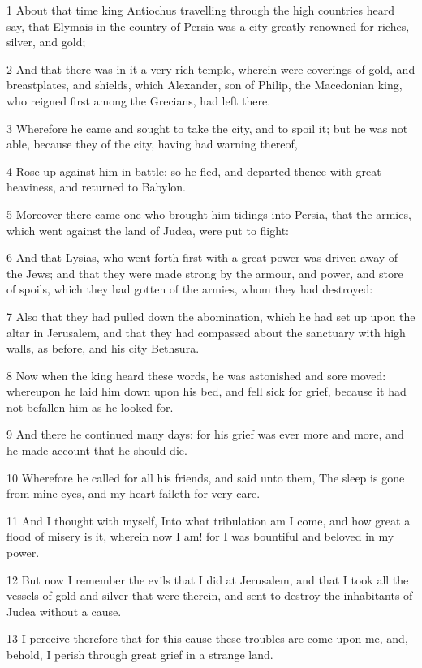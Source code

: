 \par 1 About that time king Antiochus travelling through the high countries heard say, that Elymais in the country of Persia was a city greatly renowned for riches, silver, and gold;
\par 2 And that there was in it a very rich temple, wherein were coverings of gold, and breastplates, and shields, which Alexander, son of Philip, the Macedonian king, who reigned first among the Grecians, had left there.
\par 3 Wherefore he came and sought to take the city, and to spoil it; but he was not able, because they of the city, having had warning thereof,
\par 4 Rose up against him in battle: so he fled, and departed thence with great heaviness, and returned to Babylon.
\par 5 Moreover there came one who brought him tidings into Persia, that the armies, which went against the land of Judea, were put to flight:
\par 6 And that Lysias, who went forth first with a great power was driven away of the Jews; and that they were made strong by the armour, and power, and store of spoils, which they had gotten of the armies, whom they had destroyed:
\par 7 Also that they had pulled down the abomination, which he had set up upon the altar in Jerusalem, and that they had compassed about the sanctuary with high walls, as before, and his city Bethsura.
\par 8 Now when the king heard these words, he was astonished and sore moved: whereupon he laid him down upon his bed, and fell sick for grief, because it had not befallen him as he looked for.
\par 9 And there he continued many days: for his grief was ever more and more, and he made account that he should die.
\par 10 Wherefore he called for all his friends, and said unto them, The sleep is gone from mine eyes, and my heart faileth for very care.
\par 11 And I thought with myself, Into what tribulation am I come, and how great a flood of misery is it, wherein now I am! for I was bountiful and beloved in my power.
\par 12 But now I remember the evils that I did at Jerusalem, and that I took all the vessels of gold and silver that were therein, and sent to destroy the inhabitants of Judea without a cause.
\par 13 I perceive therefore that for this cause these troubles are come upon me, and, behold, I perish through great grief in a strange land.
